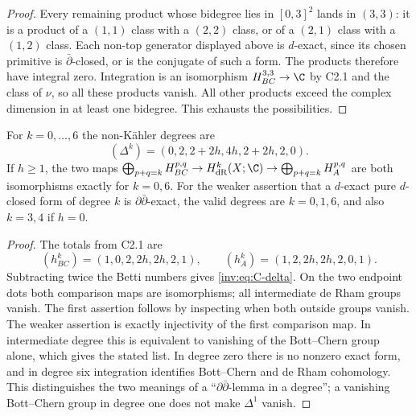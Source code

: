 \begin{proof}
Every remaining product whose bidegree lies in $[0,3]^2$ lands in
$(3,3)$: it is a product of a $(1,1)$ class with a $(2,2)$ class,
or of a $(2,1)$ class with a $(1,2)$ class.  Each non-top generator
displayed above is $d$-exact, since its chosen primitive is
$\bar\partial$-closed, or is the conjugate of such a form.
The products therefore have integral zero.  Integration is an
isomorphism $H^{3,3}_{BC}\to\C$ by C2.1 and the class of $\nu$,
so all these products vanish.  All other products exceed the complex
dimension in at least one bidegree.  This exhausts the possibilities.
\end{proof}

\begin{proposition}\label{inv:C3.4}
For $k=0,\ldots,6$ the non-K\"ahler degrees are
\begin{equation}\label{inv:eq:C-delta}
(\Delta^k)=(0,2,2+2h,4h,2+2h,2,0).
\end{equation}
If $h\ge1$, the two maps
$\bigoplus_{p+q=k}H^{p,q}_{BC}\to H^k_{\mathrm{dR}}(X;\C)
\to\bigoplus_{p+q=k}H^{p,q}_A$
are both isomorphisms exactly for $k=0,6$.
For the weaker assertion that a $d$-exact pure $d$-closed form of
degree $k$ is $\partial\bar\partial$-exact, the valid degrees are
$k=0,1,6$, and also $k=3,4$ if $h=0$.
\end{proposition}
\begin{proof}
The totals from C2.1 are
\[
(h^k_{BC})=(1,0,2,2h,2h,2,1),\qquad
(h^k_A)=(1,2,2h,2h,2,0,1).
\]
Subtracting twice the Betti numbers gives \eqref{inv:eq:C-delta}.
On the two endpoint dots both comparison maps are isomorphisms;
all intermediate de Rham groups vanish.  The first assertion follows
by inspecting when both outside groups vanish.  The weaker assertion
is exactly injectivity of the first comparison map.  In intermediate
degree this is equivalent to vanishing of the Bott--Chern group alone,
which gives the stated list.  In degree zero there is no nonzero
exact form, and in degree six integration identifies Bott--Chern and
de Rham cohomology.  This distinguishes the two meanings of a
``$\partial\bar\partial$-lemma in a degree''; a vanishing Bott--Chern
group in degree one does not make $\Delta^1$ vanish.
\end{proof}

